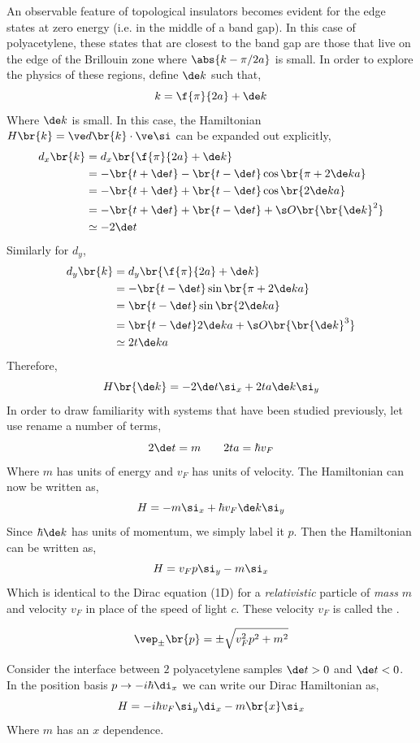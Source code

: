 \documentclass{article}
\begin{document}
An observable feature of topological insulators becomes evident for the edge states at zero energy (i.e. in the middle of a band gap). In this case of polyacetylene, these states that are closest to the band gap are those that live on the edge of the Brillouin zone where $\abs{k - \pi / 2a}$ is small. In order to explore the physics of these regions, define $\de k$ such that,
\[ k = \f{\pi}{2a} + \de k \]
Where $\de k$ is small. In this case, the Hamiltonian $H\br{k} = \ve d \br{k} \cdot \ve \si$ can be expanded out explicitly,
\begin{align*}
    d_x\br{k}
    &= d_x\br{\f{\pi}{2a} + \de k} \\
    &= - \br{t + \de t} - \br{t - \de t} \cos \br{\pi + 2 \de k a} \\
    &= - \br{t + \de t} + \br{t - \de t} \cos \br{2 \de k a} \\
    &= - \br{t + \de t} + \br{t - \de t} + \s O \br{\br{\de k}^2} \\
    &\simeq - 2 \de t
\end{align*}
Similarly for $d_y$,
\begin{align*}
    d_y\br{k}
    &= d_y\br{\f{\pi}{2a} + \de k} \\
    &= - \br{t - \de t} \sin \br{\pi + 2 \de k a} \\
    &= \br{t - \de t} \sin \br{2 \de k a} \\
    &= \br{t - \de t} 2 \de k a + \s O \br{\br{\de k}^3} \\
    &\simeq 2 t \de k a
\end{align*}
Therefore,
\[ H\br{\de k} = - 2 \de t \si_x + 2 t a \de k \si_y \]
In order to draw familiarity with systems that have been studied previously, let use rename a number of terms,
\[ 2 \de t = m \qquad 2 t a = \hbar v_F\]
Where $m$ has units of energy and $v_F$ has units of velocity. The Hamiltonian can now be written as,
\[ H = - m \si_x + \hbar v_F \de k \si_y \]
Since $\hbar \de k$ has units of momentum, we simply label it $p$. Then the Hamiltonian can be written as,
\[ H = v_F p \si_y - m \si_x \]
Which is identical to the Dirac equation (1D) for a \textit{relativistic} particle of \textit{mass} $m$ and velocity $v_F$ in place of the speed of light $c$. These velocity $v_F$ is called the .

\[ \vep_{\pm}\br{p} = \pm \sqrt{v_F^2 p^2 + m^2} \]

Consider the interface between $2$ polyacetylene samples $\de t > 0$ and $\de t < 0$. In the position basis $p \to - i \hbar \di_x$ we can write our Dirac Hamiltonian as,
\[ H = - i \hbar v_F \si_y \di_x - m\br{x} \si_x \]
Where $m$ has an $x$ dependence.
\end{document}
